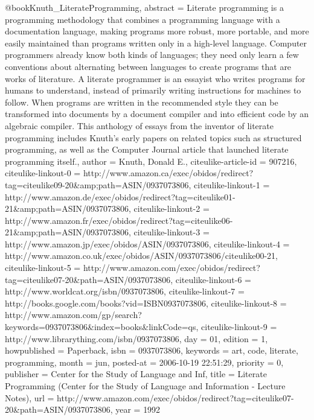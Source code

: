 {{{@book{Knuth_LiterateProgramming,
    abstract = {{Literate programming is a programming methodology that combines a programming language with a documentation language, making programs more robust, more portable, and more easily maintained than programs written only in a high-level language. Computer programmers already know both kinds of languages; they need only learn a few conventions about alternating between languages to create programs that are works of literature. A literate programmer is an essayist who writes programs for humans to understand, instead of primarily writing instructions for machines to follow. When programs are written in the recommended style they can be transformed into documents by a document compiler and into efficient code by an algebraic compiler. This anthology of essays from the inventor of literate programming includes Knuth's early papers on related topics such as structured programming, as well as the Computer Journal article that launched literate programming itself.}},
    author = {Knuth, Donald E.},
    citeulike-article-id = {907216},
    citeulike-linkout-0 = {http://www.amazon.ca/exec/obidos/redirect?tag=citeulike09-20\&amp;path=ASIN/0937073806},
    citeulike-linkout-1 = {http://www.amazon.de/exec/obidos/redirect?tag=citeulike01-21\&amp;path=ASIN/0937073806},
    citeulike-linkout-2 = {http://www.amazon.fr/exec/obidos/redirect?tag=citeulike06-21\&amp;path=ASIN/0937073806},
    citeulike-linkout-3 = {http://www.amazon.jp/exec/obidos/ASIN/0937073806},
    citeulike-linkout-4 = {http://www.amazon.co.uk/exec/obidos/ASIN/0937073806/citeulike00-21},
    citeulike-linkout-5 = {http://www.amazon.com/exec/obidos/redirect?tag=citeulike07-20\&path=ASIN/0937073806},
    citeulike-linkout-6 = {http://www.worldcat.org/isbn/0937073806},
    citeulike-linkout-7 = {http://books.google.com/books?vid=ISBN0937073806},
    citeulike-linkout-8 = {http://www.amazon.com/gp/search?keywords=0937073806\&index=books\&linkCode=qs},
    citeulike-linkout-9 = {http://www.librarything.com/isbn/0937073806},
    day = {01},
    edition = {1},
    howpublished = {Paperback},
    isbn = {0937073806},
    keywords = {art, code, literate, programming},
    month = jun,
    posted-at = {2006-10-19 22:51:29},
    priority = {0},
    publisher = {Center for the Study of Language and Inf},
    title = {{Literate Programming (Center for the Study of Language and Information - Lecture Notes)}},
    url = {http://www.amazon.com/exec/obidos/redirect?tag=citeulike07-20\&path=ASIN/0937073806},
    year = {1992}
}


}}}
